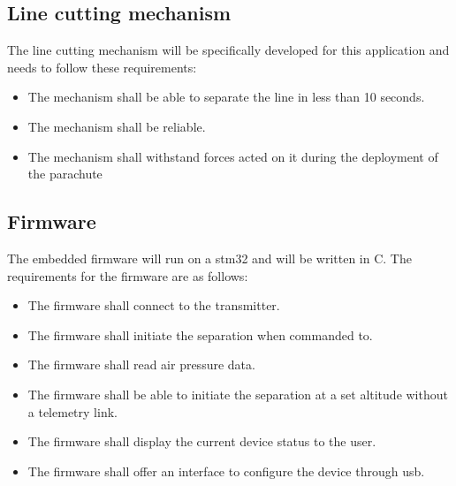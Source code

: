 \newpage

\subsection{Line cutting mechanism}
The line cutting mechanism will be specifically developed for this application and needs to follow these requirements: 
\begin{itemize}
		\item The mechanism shall be able to separate the line in less than 10 seconds.
		\item The mechanism shall be reliable.
		\item The mechanism shall withstand forces acted on it during the deployment of the parachute

\end{itemize}


\label{sec:firmware}
\subsection{Firmware}
The embedded firmware will run on a \gls{stm32} and will be written in C. The requirements for the firmware are as follows:
\begin{itemize}
    \item The firmware shall connect to the transmitter.
    \item The firmware shall initiate the separation when commanded to.
    \item The firmware shall read air pressure data.
    \item The firmware shall be able to initiate the separation at a set altitude without a telemetry link.
    \item The firmware shall display the current device status to the user.
    \item The firmware shall offer an interface to configure the device through \acrshort{usb}.
\end{itemize}

